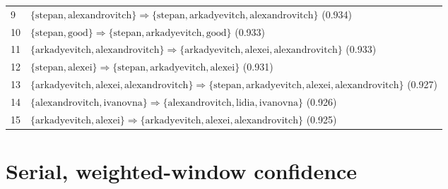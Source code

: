 \begin{appendices}
\begin{longtable}{p{20pt}|p{\dimexpr\textwidth-20pt-\tabcolsep\relax}}
9 & $ \{ \text{stepan},\allowbreak\text{alexandrovitch} \} \Rightarrow \{ \text{stepan},\allowbreak\text{arkadyevitch},\allowbreak\text{alexandrovitch} \} $ (0.934) \\
10 & $ \{ \text{stepan},\allowbreak\text{good} \} \Rightarrow \{ \text{stepan},\allowbreak\text{arkadyevitch},\allowbreak\text{good} \} $ (0.933) \\
11 & $ \{ \text{arkadyevitch},\allowbreak\text{alexandrovitch} \} \Rightarrow \{ \text{arkadyevitch},\allowbreak\text{alexei},\allowbreak\text{alexandrovitch} \} $ (0.933) \\
12 & $ \{ \text{stepan},\allowbreak\text{alexei} \} \Rightarrow \{ \text{stepan},\allowbreak\text{arkadyevitch},\allowbreak\text{alexei} \} $ (0.931) \\
13 & $ \{ \text{arkadyevitch},\allowbreak\text{alexei},\allowbreak\text{alexandrovitch} \} \Rightarrow \{ \text{stepan},\allowbreak\text{arkadyevitch},\allowbreak\text{alexei},\allowbreak\text{alexandrovitch} \} $ (0.927) \\
14 & $ \{ \text{alexandrovitch},\allowbreak\text{ivanovna} \} \Rightarrow \{ \text{alexandrovitch},\allowbreak\text{lidia},\allowbreak\text{ivanovna} \} $ (0.926) \\
15 & $ \{ \text{arkadyevitch},\allowbreak\text{alexei} \} \Rightarrow \{ \text{arkadyevitch},\allowbreak\text{alexei},\allowbreak\text{alexandrovitch} \} $ (0.925) \\
\end{longtable}

\section{Serial, weighted-window confidence}


\end{appendices}
